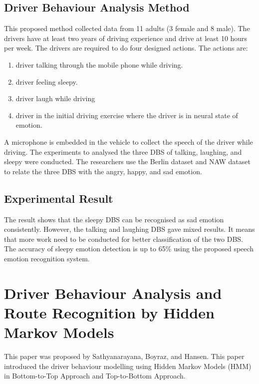 \subsection{Driver Behaviour Analysis Method}
This proposed method collected data from 11 adults (3 female and 8 male). The drivers have at least two years of driving experience and drive at least 10 hours per week. The drivers are required to do four designed actions. The actions are: 
\begin{enumerate}
\item driver talking through the mobile phone while driving.
\item driver feeling sleepy.
\item driver laugh while driving
\item driver in the initial driving exercise where the driver is in neural state of emotion.
\end{enumerate}

A microphone is embedded in the vehicle to collect the speech of the driver while driving. The experiments to analysed the three DBS of talking, laughing, and sleepy were conducted. The researchers use the Berlin dataset and NAW dataset to relate the three DBS with the angry, happy, and sad emotion.

\subsection{Experimental Result}
The result shows that the sleepy DBS can be recognised as sad emotion consistently. However, the talking and laughing DBS gave mixed results. It means that more work need to be conducted for better classification of the two DBS. The accuracy of sleepy emotion detection is up to 65\% using the proposed speech emotion recognition system.

\section{Driver Behaviour Analysis and Route Recognition by Hidden Markov Models}
This paper was proposed by Sathyanarayana, Boyraz, and Hansen\citeyear{sath:2008}. This paper introduced the driver behaviour modelling using Hidden Markov Models (HMM) in Bottom-to-Top Approach and Top-to-Bottom Approach.

